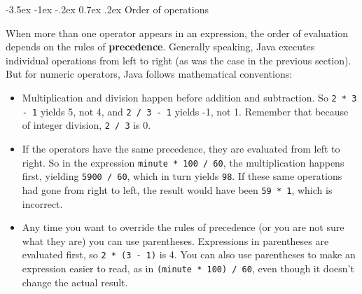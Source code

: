 \documentclass[12pt]{book}
\makeatletter
\theoremstyle{exercise}
\newcommand{\java}[1]{\verb"#1"}
\renewcommand{\section}{\@startsection {section}{1}{\z@}%
    {-3.5ex \@plus -1ex \@minus -.2ex}%
    {0.7ex \@plus.2ex}%
    {\normalfont\Large\bfseries}}
\newcommand{\java}[1]{\lstinline{#1}} %
\makeatother
\begin{document}



\section{Order of operations}


When more than one operator appears in an expression, the order of evaluation depends on the rules of {\bf precedence}.
Generally speaking, Java executes individual operations from left to right (as was the case in the previous section).
But for numeric operators, Java follows mathematical conventions:

\begin{itemize}

\item Multiplication and division happen before addition and subtraction.
So \java{2 * 3 - 1} yields 5, not 4, and \java{2 / 3 - 1} yields -1, not 1.
Remember that because of integer division, \java{2 / 3} is 0.

\item If the operators have the same precedence, they are evaluated from left to right.
So in the expression \java{minute * 100 / 60}, the multiplication happens first, yielding \java{5900 / 60}, which in turn yields \java{98}.
If these same operations had gone from right to left, the result would have been \java{59 * 1}, which is incorrect.

\item Any time you want to override the rules of precedence (or you are not sure what they are) you can use parentheses.
Expressions in parentheses are evaluated first, so \java{2 * (3 - 1)} is 4.
You can also use parentheses to make an expression easier to read, as in \java{(minute * 100) / 60}, even though it doesn't change the actual result.

\end{itemize}
\end{document}
